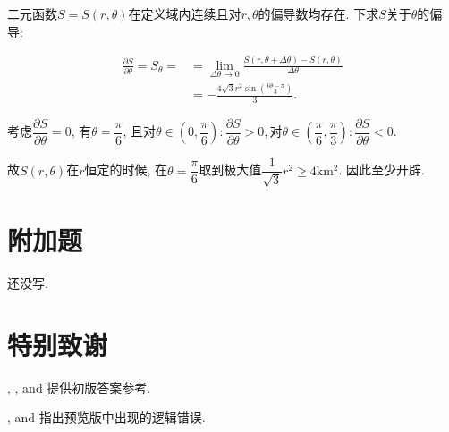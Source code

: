 \documentclass[8pt]{article}
\begin{document}
\begin{enumerate}[label=\defmath{(\arabic*)}]
					二元函数\(S=S(r, \theta)\)在定义域内连续且对\(r, \theta\)的偏导数均存在. 下求\(S\)关于\(\theta\)的偏导:

					\begin{align*}
						\frac{\partial S}{\partial \theta} = S_{\theta} =  &= \lim_{\Delta \theta \rightarrow 0}\frac{S(r, \theta + \Delta \theta) - S(r, \theta)}{\Delta \theta}\\
						&= -\frac{4\sqrt{3} r^2 \sin \left(\frac{6\theta - \pi}{3}\right)}{3}.
					\end{align*}

					考虑\(\dfrac{\partial S}{\partial \theta} = 0\), 有$\theta = \dfrac{\pi}{6}$, 且对\(\theta \in \left(0, \dfrac{\pi}{6}\right): \dfrac{\partial S}{\partial \theta}>0, \)对\(\theta \in \left(\dfrac{\pi}{6}, \dfrac{\pi}{3}\right): \dfrac{\partial S}{\partial \theta}<0\).

					故\(S(r, \theta)\)在\(r\)恒定的时候, 在\(\theta = \dfrac{\pi}{6}\)取到极大值\(\dfrac{1}{\sqrt{3}}r^2 \geq 4 \mathrm{km^2}\). 因此至少开辟.

			\end{enumerate}

	\section{附加题}
		还没写.

	\section{特别致谢}
		, , and 提供初版答案参考.

		, and 指出预览版中出现的逻辑错误.
\end{document}
